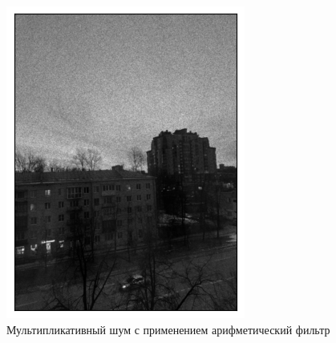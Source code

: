 \documentclass[a4paper,12pt]{article}
\begin{document}
\begin{figure}[H]
\begin{minipage}{0.49\textwidth}
        \centering \includegraphics[width=\textwidth]{results/lpf_speckle_1.png}
        \caption{Мультипликативный шум с применением арифметический фильтр}
    \end{minipage}
\end{figure}
\end{document}
